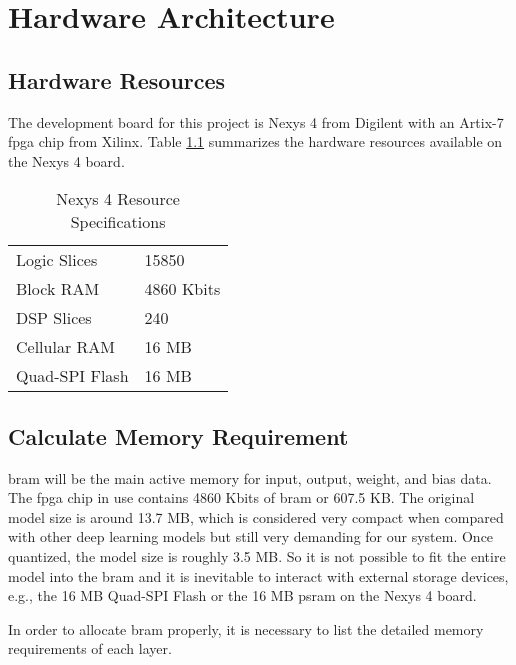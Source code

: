 
\chapter{Hardware Architecture}

\section{Hardware Resources}

The development board for this project is Nexys 4 from Digilent with an Artix-7 \gls{fpga} chip from Xilinx.
Table \ref{table:hardware_resources} summarizes the hardware resources available on the Nexys 4 board.

\begin{table}[h]
  \centering
  \caption{Nexys 4 Resource Specifications}
  \begin{tabular}{l | l}
    Logic Slices & 15850 \\
    Block RAM & 4860 Kbits \\
    DSP Slices & 240 \\
    Cellular RAM & 16 MB \\
    Quad-SPI Flash & 16 MB
  \end{tabular}
  \label{table:hardware_resources}
\end{table}

\section{Calculate Memory Requirement}

\gls{bram} will be the main active memory for input, output, weight, and bias data. The \gls{fpga} chip in use
contains 4860 Kbits of \gls{bram} or 607.5 KB. The original model size is around 13.7 MB, which is
considered very compact when compared with other deep learning models but still very demanding for
our system. Once quantized, the model size is roughly 3.5 MB. So it is not possible to fit the entire model
into the \gls{bram} and it is inevitable to interact with external storage devices, e.g., the 16 MB Quad-SPI
Flash or the 16 MB \gls{psram} on the Nexys 4 board.

In order to allocate \gls{bram} properly, it is necessary to list the detailed memory requirements of each
layer.

